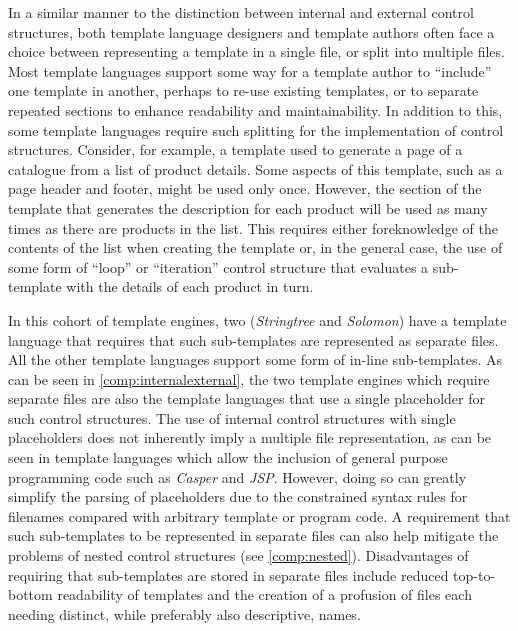 In a similar manner to the distinction between internal and external control structures, both \gls{template language} designers and template authors often face a choice between representing a template in a single file, or split into multiple files. Most \gls{template language}s support some way for a template author to \enquote{include} one template in another, perhaps to re-use existing templates, or to separate repeated sections to enhance readability and maintainability. In addition to this, some \gls{template language}s require such splitting for the implementation of control structures. Consider, for example, a template used to generate a page of a catalogue from a list of product details. Some aspects of this template, such as a page header and footer, might be used only once. However, the section of the template that generates the description for each product will be used as many times as there are products in the list. This requires either foreknowledge of the contents of the list when creating the template or, in the general case, the use of some form of \enquote{loop} or \enquote{iteration} control structure that evaluates a sub-template with the details of each product in turn.

In this cohort of \gls{template engine}s, two (\emph{Stringtree} and \emph{Solomon}) have a \gls{template language} that requires that such sub-templates are represented as separate files. All the other \gls{template language}s support some form of in-line sub-templates. As can be seen in \autoref{comp:internalexternal}, the two \gls{template engine}s which require separate files are also the \gls{template language}s that use a single placeholder for such control structures. The use of internal control structures with single placeholders does not inherently imply a multiple file representation, as can be seen in \gls{template language}s which allow the inclusion of general purpose programming code such as \emph{Casper} and \emph{JSP}. However, doing so can greatly simplify the parsing of placeholders due to the constrained syntax rules for filenames compared with arbitrary template or program code. A requirement that such sub-templates to be represented in separate files can also help mitigate the problems of nested control structures (see \autoref{comp:nested}). Disadvantages of requiring that sub-templates are stored in separate files include reduced top-to-bottom readability of templates and the creation of a profusion of files each needing distinct, while preferably also descriptive, names.

